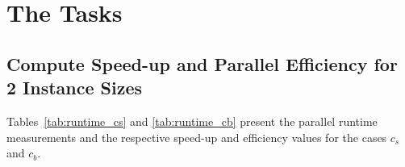 \documentclass[a4paper,%
11pt,%
DIV12,
headsepline,%
headings=normal,
]{scrartcl}
\begin{document}
\maketitlepage




\setcounter{section}{1}
\section{The Tasks}

\setcounter{subsection}{1}

\subsection{Compute Speed-up and Parallel Efficiency for 2 Instance Sizes }
Tables~\ref{tab:runtime_cs} and \ref{tab:runtime_cb} present the parallel runtime measurements and the respective speed-up and efficiency values for the cases $c_s$ and $c_b$.
\end{document}
